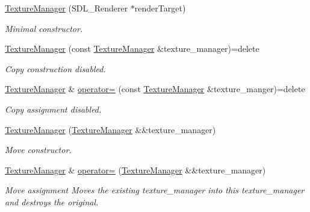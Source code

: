 \begin{DoxyCompactItemize}
\item 
\mbox{\hyperlink{classinferno_1_1graphics_1_1_texture_manager_a06e141712b3786bae5100da3e04aff92}{Texture\+Manager}} (S\+D\+L\+\_\+\+Renderer $\ast$render\+Target)
\begin{DoxyCompactList}\small\item\em Minimal constructor. \end{DoxyCompactList}\item 
\mbox{\hyperlink{classinferno_1_1graphics_1_1_texture_manager_a6aaf05d68384081740e7b59752f5ea86}{Texture\+Manager}} (const \mbox{\hyperlink{classinferno_1_1graphics_1_1_texture_manager}{Texture\+Manager}} \&texture\+\_\+manager)=delete
\begin{DoxyCompactList}\small\item\em Copy construction disabled. \end{DoxyCompactList}\item 
\mbox{\hyperlink{classinferno_1_1graphics_1_1_texture_manager}{Texture\+Manager}} \& \mbox{\hyperlink{classinferno_1_1graphics_1_1_texture_manager_a328ab24dd273a41437c23abafbf978c0}{operator=}} (const \mbox{\hyperlink{classinferno_1_1graphics_1_1_texture_manager}{Texture\+Manager}} \&texture\+\_\+manger)=delete
\begin{DoxyCompactList}\small\item\em Copy assignment disabled. \end{DoxyCompactList}\item 
\mbox{\hyperlink{classinferno_1_1graphics_1_1_texture_manager_a91ac9443d92df72ecedee3cf16401965}{Texture\+Manager}} (\mbox{\hyperlink{classinferno_1_1graphics_1_1_texture_manager}{Texture\+Manager}} \&\&texture\+\_\+manager)
\begin{DoxyCompactList}\small\item\em Move constructor. \end{DoxyCompactList}\item 
\mbox{\hyperlink{classinferno_1_1graphics_1_1_texture_manager}{Texture\+Manager}} \& \mbox{\hyperlink{classinferno_1_1graphics_1_1_texture_manager_ac413011a070590a960995b21eb4e3fdb}{operator=}} (\mbox{\hyperlink{classinferno_1_1graphics_1_1_texture_manager}{Texture\+Manager}} \&\&texture\+\_\+manager)
\begin{DoxyCompactList}\small\item\em Move assignment Moves the existing texture\+\_\+manager into this texture\+\_\+manager and destroys the original. \end{DoxyCompactList}\item 

\end{DoxyCompactItemize}
